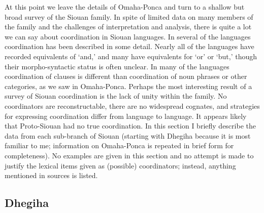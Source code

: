 \documentclass[output=paper]{LSP/langsci}
\begin{document}
At this point we leave the details of Omaha-Ponca and turn to a shallow but broad survey of the Siouan family. In spite of limited data on many members of the family and the challenges of interpretation and analysis, there is quite a lot we can say about coordination in Siouan languages. In several of the languages coordination has been described in some detail. Nearly all of the languages have recorded equivalents of `and,' and many have equivalents for `or' or `but,' though their morpho-syntactic status is often unclear. In many of the languages coordination of clauses is different than coordination of noun phrases or other categories, as we saw in Omaha-Ponca. Perhaps the most interesting result of a survey of Siouan coordination is the lack of unity within the family. No coordinators are reconstructable, there are no widespread cognates, and strategies for expressing coordination differ from language to language. It appears likely that Proto-Siouan had no true coordination. In this section I briefly describe the data from each sub-branch of Siouan (starting with Dhegiha because it is most familiar to me; information on Omaha-Ponca is repeated in brief form for completeness). No examples are given in this section and no attempt is made to justify the lexical items given as (possible) coordinators; instead, anything mentioned in sources is listed.

\subsection{Dhegiha}
 
\end{document}
